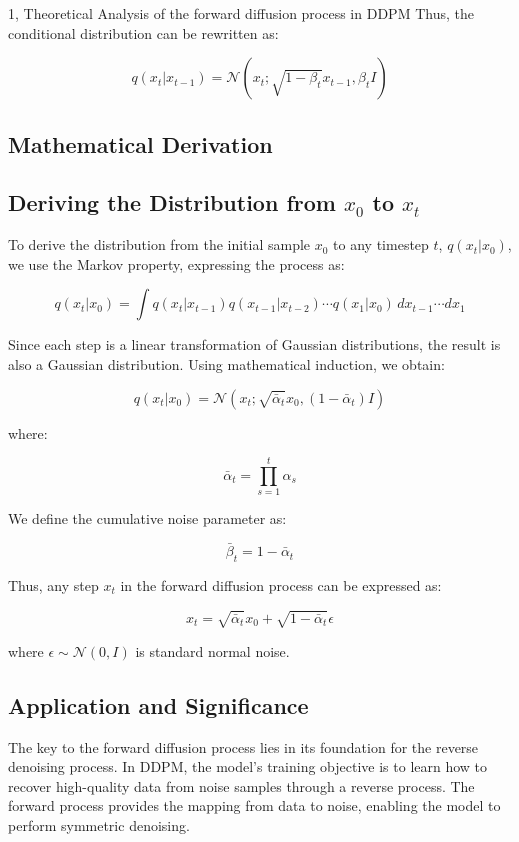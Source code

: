 \documentclass[10pt,a4paper]{article}
\begin{document}
\begin{task}{1,  Theoretical Analysis of the forward diffusion process in DDPM}
Thus, the conditional distribution can be rewritten as:

\[
q(x_t | x_{t-1}) = \mathcal{N}(x_t; \sqrt{1 - \beta_t} x_{t-1}, \beta_t I)
\]

\subsection{Mathematical Derivation}

\subsection*{Deriving the Distribution from \( x_0 \) to \( x_t \)}

To derive the distribution from the initial sample \( x_0 \) to any timestep \( t \), \( q(x_t | x_0) \), we use the Markov property, expressing the process as:

\[
q(x_t | x_0) = \int q(x_t | x_{t-1}) q(x_{t-1} | x_{t-2}) \cdots q(x_1 | x_0) \, dx_{t-1} \cdots dx_1
\]

Since each step is a linear transformation of Gaussian distributions, the result is also a Gaussian distribution. Using mathematical induction, we obtain:

\[
q(x_t | x_0) = \mathcal{N}(x_t; \sqrt{\bar{\alpha}_t} x_0, (1 - \bar{\alpha}_t) I)
\]

where:

\[
\bar{\alpha}_t = \prod_{s=1}^t \alpha_s
\]

We define the cumulative noise parameter as:

\[
\bar{\beta}_t = 1 - \bar{\alpha}_t
\]

Thus, any step \( x_t \) in the forward diffusion process can be expressed as:

\[
x_t = \sqrt{\bar{\alpha}_t} x_0 + \sqrt{1 - \bar{\alpha}_t} \epsilon
\]

where \(\epsilon \sim \mathcal{N}(0, I)\) is standard normal noise.

\subsection{Application and Significance}

The key to the forward diffusion process lies in its foundation for the reverse denoising process. In DDPM, the model's training objective is to learn how to recover high-quality data from noise samples through a reverse process. The forward process provides the mapping from data to noise, enabling the model to perform symmetric denoising.

\end{task}
\newpage
\end{document}
